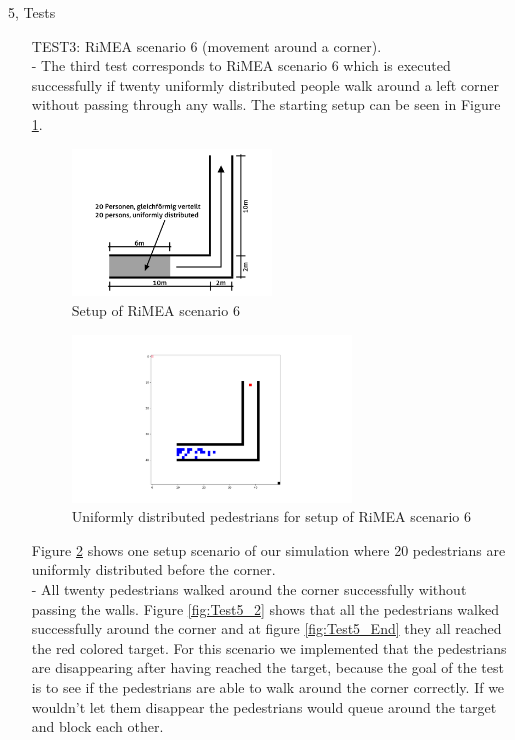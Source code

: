 \documentclass[10pt,a4paper]{article}
\begin{document}
\begin{task}{5, Tests}
\begin{enumerate}
\item[TEST3:] RiMEA scenario 6 (movement around a corner).\\
- The third test corresponds to RiMEA scenario 6 which is executed successfully if twenty uniformly distributed people walk around a left corner without passing through any walls. The starting setup can be seen in Figure \ref{fig:corner}.
\begin{figure}
    \centering
    \includegraphics[width=0.5\textwidth]{pictures/corner.png}
    \caption{Setup of RiMEA scenario 6}
    \label{fig:corner}
\end{figure}
\begin{figure}
    \centering
    \includegraphics[width=0.7\textwidth]{pictures/Test5.png}
    \caption{Uniformly distributed pedestrians for setup of RiMEA scenario 6}
    \label{fig:test5_1}
\end{figure}
Figure \ref{fig:test5_1} shows one setup scenario of our simulation where 20 pedestrians are uniformly distributed before the corner.\\
- All twenty pedestrians walked around the corner successfully without passing the walls. Figure \ref{fig:Test5_2} shows that all the pedestrians walked successfully around the corner and at figure \ref{fig:Test5_End} they all reached the red colored target. For this scenario we implemented that the pedestrians are disappearing after having reached the target, because the goal of the test is to see if the pedestrians are able to walk around the corner correctly. If we wouldn't let them disappear the pedestrians would queue around the target and block each other.

\end{enumerate}
\end{task}
\end{document}
